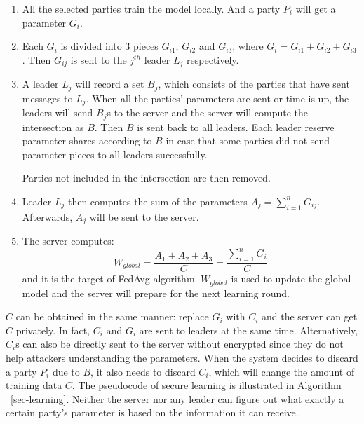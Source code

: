 \begin{enumerate}
    \item All the selected parties train the model locally. And a party $P_i$ will get a parameter $G_i$.
    
    \item Each $G_i$ is divided into 3 pieces $G_{i1}$, $G_{i2}$ and $G_{i3}$, where $G_i = G_{i1} + G_{i2} + G_{i3}$. Then $G_{ij}$ is sent to the $j^{th}$ leader $L_j$ respectively.
    
    \item A leader $L_j$ will record a set $B_j$, which consists of the parties that have sent messages to $L_j$. When all the parties' parameters are sent or time is up, the leaders will send $B_j$s to the server and the server will compute the intersection as $B$. Then $B$ is sent back to all leaders. Each leader reserve parameter shares according to $B$ in case that some parties did not send parameter pieces to all leaders successfully. 

    Parties not included in the intersection are then removed. 

    \item Leader $L_j$ then computes the sum of the parameters $A_j = \sum_{i=1}^nG_{ij}$. Afterwards, $A_j$ will be sent to the server.

    \item The server computes: 
    $$W_{global} = \frac{A_1 + A_2 + A_3}{C}  = \frac{\sum_{i=1}^nG_i}{C} $$ 
    and it is the target of FedAvg algorithm. $W_{global}$ is used to update the global model and the server will prepare for the next learning round.
\end{enumerate}

$C$ can be obtained in the same manner: replace $G_i$ with $C_i$ and the server can get $C$ privately. In fact, $C_i$ and $G_i$ are sent to leaders at the same time. Alternatively, $C_i$s can also be directly sent to the server without encrypted since they do not help attackers understanding the parameters. When the system decides to discard a party $P_i$ due to $B$, it also needs to discard $C_i$, which will change the amount of training data $C$. The pseudocode of secure learning is illustrated in Algorithm ~\ref{sec-learning}. Neither the server nor any leader can figure out what exactly a certain party's parameter is based on the information it can receive. 

